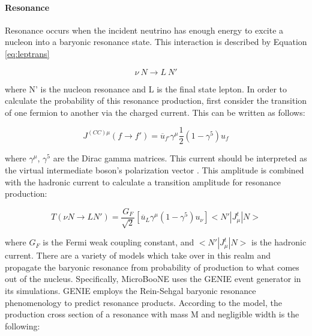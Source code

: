 
\paragraph {Resonance}  Resonance occurs when the incident neutrino has enough energy to excite a nucleon into a baryonic resonance state. This interaction is described by Equation \ref{eq:leptrans} 

\begin{equation}
\label{eq:leptrans}
   \nu \ N \rightarrow L\ N'
\end{equation}

\noindent where N' is the nucleon resonance and L is the final state lepton. In order to calculate the probability of this resonance production, first consider the transition of one fermion to another via the charged current. This can be written as follows:

\begin{equation}
   J^{(CC)\mu}(f \rightarrow f') =  \overline{u}_{f'}\gamma^\mu \frac{1}{2}(1 - \gamma^5)u_f
\end{equation}

\noindent where $\gamma^\mu$, $\gamma^5$ are the Dirac gamma matrices.  This current should be interpreted as the virtual intermediate boson's polarization vector  \cite{bib:rein_sehgal}.  This amplitude is combined with the hadronic current to calculate a transition amplitude for resonance production:

\begin{equation}
  T(\nu N \rightarrow L N') = \frac{G_F}{\sqrt{2}}[\overline{u}_L \gamma^\mu (1 - \gamma^5)u_\nu] <N'|J^t_\mu|N>
\end{equation}

\noindent where $G_F$ is the Fermi weak coupling constant, and $<N'|J^t_\mu|N>$ is the hadronic current.  There are a variety of models which take over in this realm and propagate the baryonic resonance from probability of production to what comes out of the nucleus.  Specifically, MicroBooNE uses the GENIE event generator \cite{bib:genie} in its simulations.  GENIE employs the Rein-Sehgal baryonic resonance phenomenology \cite{bib:rein_sehgal} to predict resonance products.  According to the model, the production cross section of a resonance with mass M and negligible width is the following:


